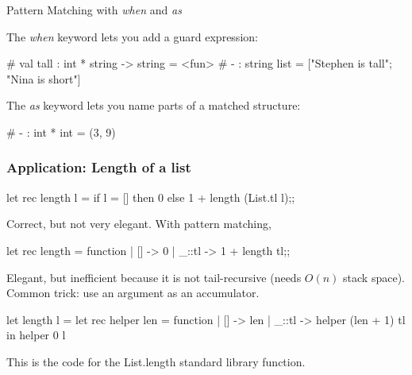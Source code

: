 \documentclass{plt}
\begin{document}
\begin{frame}[fragile]{Pattern Matching with \emph{when} and \emph{as}}

The \emph{when} keyword lets you add a guard expression:

\begin{interactive}
#  
val tall : int * string -> string = <fun>
# 
- : string list = ["Stephen is tall"; "Nina is short"]
\end{interactive}

The \emph{as} keyword lets you name parts of a matched structure:

\begin{interactive}
# 
- : int * int = (3, 9)
\end{interactive}

\end{frame}

\begin{frame}[fragile]
  \frametitle{Application: Length of a list}

\begin{ocaml}
let rec length l =
  if l = [] then 0 else 1 + length (List.tl l);;
\end{ocaml}

Correct, but not very elegant.  With pattern matching,

\begin{ocaml}
let rec length = function
 |  []    -> 0
 | _::tl -> 1 + length tl;;
\end{ocaml}

Elegant, but inefficient because it is not tail-recursive (needs
$O(n)$ stack space).  Common trick: use an argument as an accumulator.

\begin{ocaml}
let length l =
  let rec helper len = function
    |  []    -> len
    | _::tl -> helper (len + 1) tl
  in helper 0 l
\end{ocaml}

This is the code for the List.length standard library function.

\end{frame}
\end{document}
